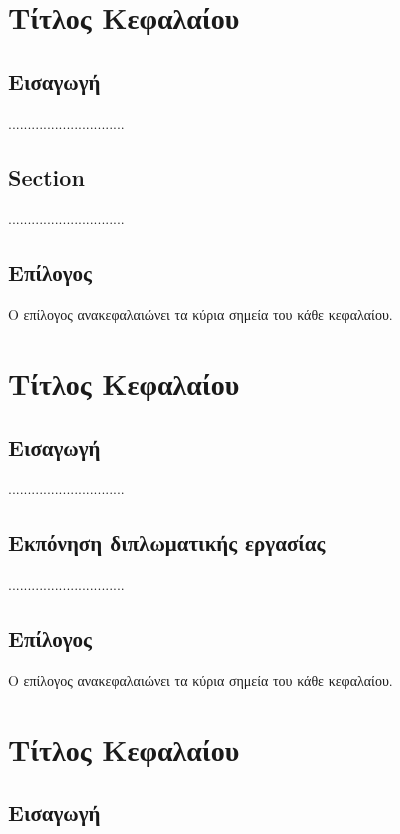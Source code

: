 \documentclass[twoside, a4paper, 11pt]{article}
\begin{document}

\setlength{\parskip}{1em}

\section{Τίτλος Κεφαλαίου}

\subsection{Εισαγωγή}
..............................

\subsection{Section}
..............................

\subsection{Επίλογος}
Ο επίλογος ανακεφαλαιώνει τα κύρια σημεία του κάθε κεφαλαίου.

\clearpage
\section{Τίτλος Κεφαλαίου}

\subsection{Εισαγωγή}
..............................

\subsection{Εκπόνηση διπλωματικής εργασίας } \label{subsection:problem-analysis}
..............................

\subsection{Επίλογος}
Ο επίλογος ανακεφαλαιώνει τα κύρια σημεία του κάθε κεφαλαίου.

\clearpage

\section{Τίτλος Κεφαλαίου}

\subsection{Εισαγωγή}
\end{document}
